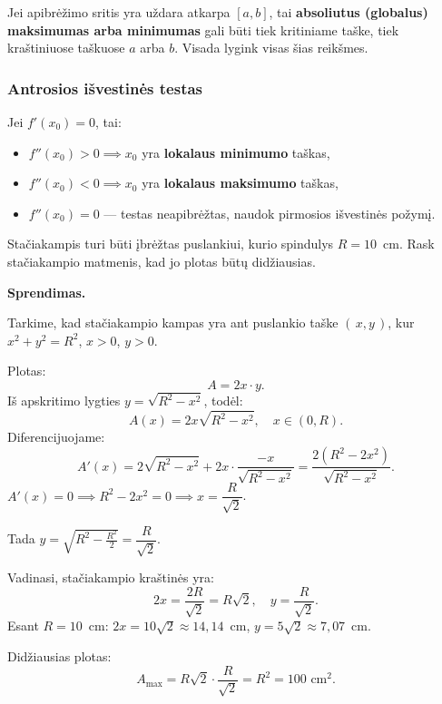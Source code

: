 \begin{remark}
Jei apibrėžimo sritis yra uždara atkarpa $[a,b]$, tai \textbf{absoliutus (globalus)
maksimumas arba minimumas} gali būti tiek kritiniame taške, tiek kraštiniuose
taškuose $a$ arba $b$. Visada lygink visas šias reikšmes.
\end{remark}

\subsubsection*{Antrosios išvestinės testas}

Jei $f'(x_0) = 0$, tai:
\begin{itemize}
    \item $f''(x_0) > 0 \implies x_0$ yra \textbf{lokalaus minimumo} taškas,
    \item $f''(x_0) < 0 \implies x_0$ yra \textbf{lokalaus maksimumo} taškas,
    \item $f''(x_0) = 0$ --- testas neapibrėžtas, naudok pirmosios išvestinės požymį.
\end{itemize}

\begin{example}
Stačiakampis turi būti įbrėžtas puslankiui, kurio spindulys $R = 10$~cm.
Rask stačiakampio matmenis, kad jo plotas būtų didžiausias.

\textbf{Sprendimas.}

Tarkime, kad stačiakampio kampas yra ant puslankio taške $(\,x, y\,)$, kur
$x^2 + y^2 = R^2$, $x > 0$, $y > 0$.

Plotas:
\[
    A = 2x \cdot y.
\]
Iš apskritimo lygties $y = \sqrt{R^2 - x^2}$, todėl:
\[
    A(x) = 2x\sqrt{R^2 - x^2}, \quad x \in (0, R).
\]
Diferencijuojame:
\[
    A'(x) = 2\sqrt{R^2 - x^2} + 2x \cdot \frac{-x}{\sqrt{R^2 - x^2}}
           = \frac{2(R^2 - 2x^2)}{\sqrt{R^2 - x^2}}.
\]
$A'(x) = 0 \implies R^2 - 2x^2 = 0 \implies x = \dfrac{R}{\sqrt{2}}$.

Tada $y = \sqrt{R^2 - \tfrac{R^2}{2}} = \dfrac{R}{\sqrt{2}}$.

Vadinasi, stačiakampio kraštinės yra:
\[
    2x = \frac{2R}{\sqrt{2}} = R\sqrt{2}, \quad y = \frac{R}{\sqrt{2}}.
\]
Esant $R = 10$~cm: $2x = 10\sqrt{2} \approx 14{,}14$~cm, $y = 5\sqrt{2} \approx 7{,}07$~cm.

Didžiausias plotas:
\[
    A_{\max} = R\sqrt{2} \cdot \frac{R}{\sqrt{2}} = R^2 = 100 \text{ cm}^2.
\]
\end{example}


